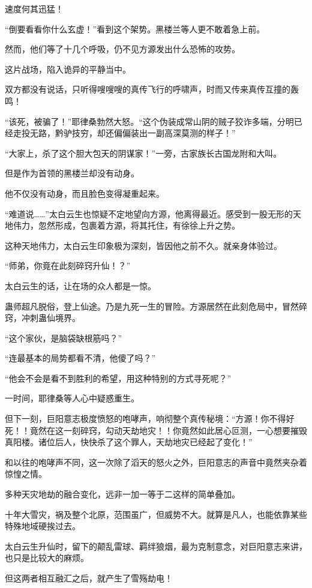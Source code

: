 \begin{this_body}
速度何其迅猛！

“倒要看看你什么玄虚！”看到这个架势。黑楼兰等人更不敢着急上前。

然而，他们等了十几个呼吸，仍不见方源发出什么恐怖的攻势。

这片战场，陷入诡异的平静当中。

双方都没有说话，只听得嗖嗖嗖的真传飞行的呼啸声，时而又传来真传互撞的轰鸣！

“该死，被骗了！”耶律桑勃然大怒。“这个伪装成常山阴的贼子狡诈多端，分明已经走投无路，黔驴技穷，却还偏偏装出一副高深莫测的样子！”

“大家上，杀了这个胆大包天的阴谋家！”一旁，古家族长古国龙附和大叫。

但是作为首领的黑楼兰却没有动身。

他不仅没有动身，而且脸色变得凝重起来。

“难道说……”太白云生也惊疑不定地望向方源，他离得最近。感受到一股无形的天地伟力，忽然形成，包裹着方源，将其托住，有徐徐上升之势。

这种天地伟力，太白云生印象极为深刻，皆因他之前不久。就亲身体验过。

“师弟，你竟在此刻碎窍升仙！？”

太白云生的话，让在场的众人都是一惊。

蛊师超凡脱俗，登上仙途。乃是九死一生的冒险。方源居然在此刻危局中，冒然碎窍，冲刺蛊仙境界。

“这个家伙，是脑袋缺根筋吗？”

“连最基本的局势都看不清，他傻了吗？”

“他会不会是看不到胜利的希望，用这种特别的方式寻死呢？”

一时间，耶律桑等人心中疑惑重生。

但下一刻，巨阳意志极度愤怒的咆哮声，响彻整个真传秘境：“方源！你不得好死！！竟然在这一刻碎窍，勾动天劫地灾！！你竟然如此居心叵测，一心想要摧毁真阳楼。诸位后人，快快杀了这个罪人，天劫地灾已经起了变化！”

和以往的咆哮声不同，这一次除了滔天的怒火之外，巨阳意志的声音中竟然夹杂着惊惶之情。

多种天灾地劫的融合变化，远非一加一等于二这样的简单叠加。

十年大雪灾，祸及整个北原，范围虽广，但威势不大。就算是凡人，也能依靠某些特殊地域硬挨过去。

太白云生升仙时，留下的颠乱雷球、羁绊狼烟，最为克制意念，对巨阳意志来讲，也只是比较大的麻烦。

但这两者相互融汇之后，就产生了雪殇劫电！


\end{this_body}
